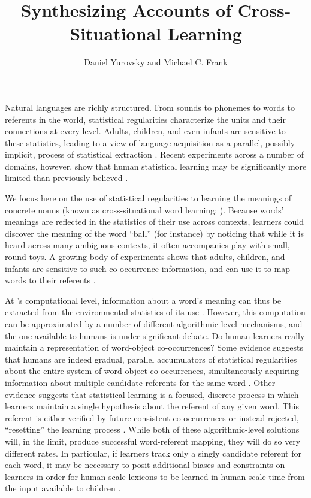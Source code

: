 \documentclass[man,floatsintext]{apa6}
\title{Synthesizing Accounts of Cross-Situational Learning}
\author{Daniel Yurovsky and Michael C. Frank}
\affiliation{Department of Psychology, Stanford University}
\begin{document}
\maketitle

Natural languages are richly structured. From sounds to phonemes to words to referents in the world, statistical regularities characterize the units and their connections at every level. Adults, children, and even infants are sensitive to these statistics, leading to a view of language acquisition as a parallel, possibly implicit, process of statistical extraction \cite{Saffran1996a, Gomez2000}. Recent experiments across a number of domains, however, show that human statistical learning may be significantly more limited than previously believed \cite{Johnson2010c, Yurovsky2012c, Trueswell2013}.

We focus here on the use of statistical regularities to learning the meanings of concrete nouns (known as cross-situational word learning;  ). Because words' meanings are reflected in the statistics of their use across contexts, learners could discover the meaning of the word ``ball'' (for instance) by noticing that while it is heard across many ambiguous contexts, it often accompanies play with small, round toys. A growing body of experiments shows that adults, children, and infants are sensitive to such co-occurrence information, and can use it to map words to their referents \cite{Yu2007, Smith2008, Scott2012, Vlach2013}.

At \citeauthor{Marr1982}'s \citeyear{Marr1982} computational level, information about a word's meaning can thus be extracted from the environmental statistics of its use \cite{Frank2009a}. However, this computation can be approximated by a number of different algorithmic-level mechanisms, and the one available to humans is under significant debate. Do human learners really maintain a representation of word-object co-occurrences? Some evidence suggests that humans are indeed gradual, parallel accumulators of statistical regularities about the entire system of word-object co-occurrences, simultaneously acquiring information about multiple candidate referents for the same word \cite{Vouloumanos2008, McMurray2012, Yurovsky2014}. Other evidence suggests that statistical learning is a focused, discrete process in which learners maintain a single hypothesis about the referent of any given word. This referent is either verified by future consistent co-occurrences or instead rejected, ``resetting'' the learning process \cite{Medina2011, Trueswell2013}. While both of these algorithmic-level solutions will, in the limit, produce successful word-referent mapping, they will do so very different rates. In particular, if learners track only a singly candidate referent for each word, it may be necessary to posit additional biases and constraints on learners in order for human-scale lexicons to be learned in human-scale time from the input available to children \cite{Vogt2012, Reisenauer2013}.
\end{document}
